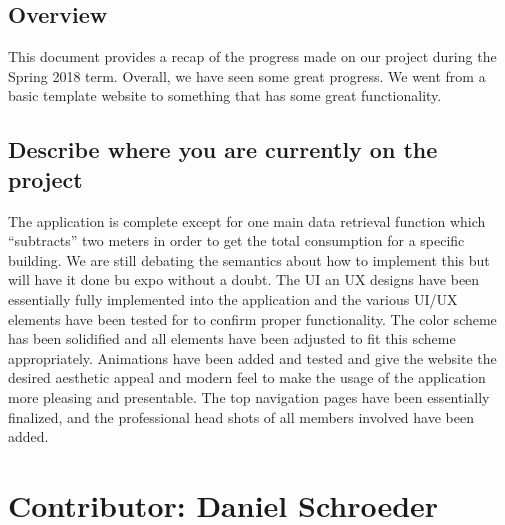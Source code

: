 \documentclass[letterpaper,10pt,serif,draftclsnofoot,onecolumn,compsoc,titlepage]{IEEEtran}
\begin{document}
\subsection{Overview}
This document provides a recap of the progress made on our project during the Spring 2018 term. Overall, we have seen some great progress. We went from a basic template website to something that has some great functionality. \\ 
\subsection{Describe where you are currently on the project}
The application is complete except for one main data retrieval function which ``subtracts'' two meters in order to get the total consumption for a specific building. We are still debating the semantics about how to implement this but will have it done bu expo without a doubt.
The UI an UX designs have been essentially fully implemented into the application and the various UI/UX elements have been tested for to confirm proper functionality. The color scheme has been solidified and all elements have been adjusted to fit this scheme appropriately. Animations have been added and tested and give the website the desired aesthetic appeal and modern feel to make the usage of the application more pleasing and presentable. The top navigation pages have been essentially finalized, and the professional head shots of all members involved have been added.

\section{Contributor: Daniel Schroeder} 
\end{document}
